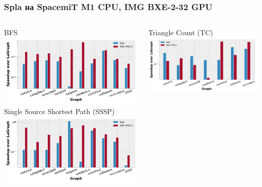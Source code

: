 \documentclass[xcolor=table,aspectratio=169]{beamer}
\begin{document}
\begin{frame}
  \frametitle{Spla на SpacemiT M1 CPU, IMG BXE-2-32 GPU}

\begin{columns}
        \vspace{-0.5cm}
        \begin{center}
          BFS \\
        \includegraphics[width=0.909\linewidth]{pictures/rq1_rel_bfs.pdf}
        Single Source Shortest Path (SSSP) \\
        \includegraphics[width=0.909\linewidth]{pictures/rq1_rel_sssp.pdf}
        \end{center}
        \vspace{-0.5cm}
        \begin{center}
          Triangle Count (TC) \\
        \includegraphics[width=0.9\linewidth]{pictures/rq1_rel_tc.pdf}

\end{center}
\end{columns}
\end{frame}
\end{document}
